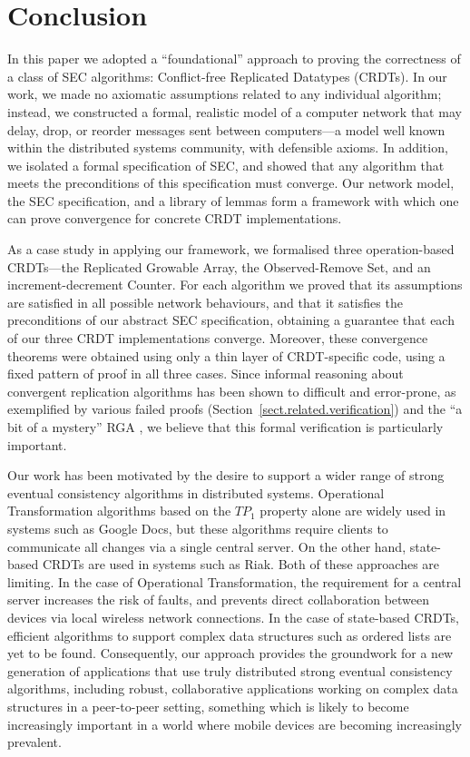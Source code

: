\documentclass[acmlarge,review,anonymous]{acmart}
\begin{document}
\section{Conclusion}
\label{sect.conclusion}

In this paper we adopted a ``foundational'' approach to proving the correctness of a class of SEC algorithms: Conflict-free Replicated Datatypes (CRDTs).
In our work, we made no axiomatic assumptions related to any individual algorithm; instead, we constructed a formal, realistic model of a computer network that may delay, drop, or reorder messages sent between computers---a model well known within the distributed systems community, with defensible axioms.
In addition, we isolated a formal specification of SEC, and showed that any algorithm that meets the preconditions of this specification must converge.
Our network model, the SEC specification, and a library of lemmas form a framework with which one can prove convergence for concrete CRDT implementations.

As a case study in applying our framework, we formalised three operation-based CRDTs---the Replicated Growable Array, the Observed-Remove Set, and an increment-decrement Counter.
For each algorithm we proved that its assumptions are satisfied in all possible network behaviours, and that it satisfies the preconditions of our abstract SEC specification, obtaining a guarantee that each of our three CRDT implementations converge.
Moreover, these convergence theorems were obtained using only a thin layer of CRDT-specific code, using a fixed pattern of proof in all three cases.
Since informal reasoning about convergent replication algorithms has been shown to difficult and error-prone, as exemplified by various failed proofs (Section~\ref{sect.related.verification}) and the ``a bit of a mystery'' RGA \cite{Attiya:2016kh}, we believe that this formal verification is particularly important.

Our work has been motivated by the desire to support a wider range of strong eventual consistency algorithms in distributed systems.
Operational Transformation algorithms based on the $\mathit{TP}_1$ property alone are widely used in systems such as Google Docs, but these algorithms require clients to communicate all changes via a single central server.
On the other hand, state-based CRDTs are used in systems such as Riak.
Both of these approaches are limiting.
In the case of Operational Transformation, the requirement for a central server increases the risk of faults, and prevents direct collaboration between devices via local wireless network connections.
In the case of state-based CRDTs, efficient algorithms to support complex data structures such as ordered lists are yet to be found.
Consequently, our approach provides the groundwork for a new generation of applications that use truly distributed strong eventual consistency algorithms, including robust, collaborative applications working on complex data structures in a peer-to-peer setting, something which is likely to become increasingly important in a world where mobile devices are becoming increasingly prevalent.
\end{document}
